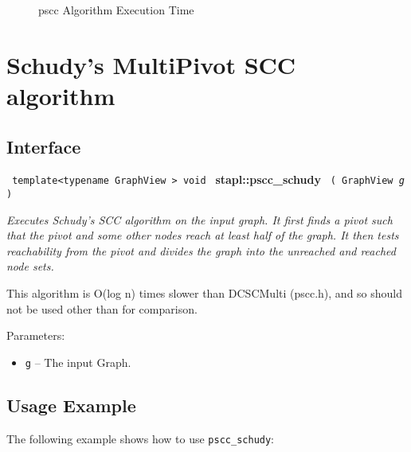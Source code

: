 \begin{figure}[p]
\caption{pscc Algorithm Execution Time}
\label{fig:pscc-alg-exec-exper}
\end{figure}


\section{ Schudy's MultiPivot SCC algorithm}
\label{sec-pscc-schudy-alg}

\subsection{Interface} \label{sec-pscc-schudy-alg-inter}

\noindent
\texttt{%
template<typename GraphView >
\newline
void 
}
\newline
\textbf{stapl::pscc\_schudy}%
\newline
\texttt{%
(
GraphView
\textit{g}%
)    
}
\vspace{0.4cm}

\textit{
Executes Schudy's SCC algorithm on the input graph. It first finds a pivot such that the pivot and some other nodes reach at least half of the graph. It then tests reachability from the pivot and divides the graph into the unreached and reached node sets.
}
\vspace{0.4cm}

This algorithm is O(log n) times slower than DCSCMulti (pscc.h), and so should not be used other than for comparison. 

Parameters:
\begin{itemize}
\item
\texttt{g} --
The input Graph.
\end{itemize}

\subsection{Usage Example} \label{sec-pscc-schudy-alg-use}

The following example shows how to use 
\texttt{pscc\_schudy}:


